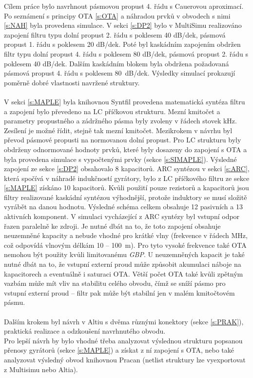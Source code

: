 \noindent Cílem práce bylo navrhnout pásmovou propust 4. řádu s Cauerovou aproximací. Po seznámení s principy OTA \ref{s:OTA} a náhradou prvků v obvodech s nimi \ref{s:NAH} byla provedena simulace. V sekci \ref{s:DP2} bylo v MultiSimu realizováno zapojení filtru typu dolní propust 2. řádu s poklesem 40 dB/dek, pásmová propust 1. řádu s poklesem 20 dB/dek. Poté byl kaskádním zapojením obdržen filtr typu dolní propust 4. řádu s poklesem 80 dB/dek, pásmová propust 2. řádu s poklesem 40 dB/dek. Dalším kaskádním blokem byla obdržena požadovaná pásmová propust 4. řádu s poklesem 80~dB/dek. Výsledky simulací prokazují poměrně dobré vlastnosti navržené struktury.\\
\\
V sekci \ref{s:MAPLE} byla knihovnou Syntfil provedena matematická syntéza filtru a zapojení bylo převedeno na LC příčkovou strukturu. Mezní kmitočet a parametry propustného a zádržného pásma byly zvoleny v řádech stovek kHz. Zesílení je možné řídit, stejně tak mezní kmitočet. Mezikrokem v návrhu byl převod pásmové propusti na normovanou dolní propust. Pro LC strukturu byly obdrženy odnormované hodnoty prvků, které byly dosazeny do zapojení s OTA a byla provedena simulace s vypočtenými prvky (sekce \ref{s:SIMAPLE}). Výsledné zapojení ze sekce \ref{s:DP2} obsahovalo 8 kapacitorů. ARC syntézou v sekci \ref{s:ARC}, která spočívá v náhradě indukčností gyrátory, bylo z LC příčkového filtru ze sekce \ref{s:MAPLE} získáno 10 kapacitorů. Kvůli použití pouze rezistorů a kapacitorů jsou filtry realizované kaskádní syntézou výhodnější, protože induktory se musí složitě vyrábět na danou hodnotu. Výsledné schéma celkem obsahuje 12 pasivních a 13 aktivních komponent. V simulaci vycházející z ARC syntézy byl vstupní odpor řazen paralelně ke zdroji. Je nutné dbát na to, že toto zapojení obsahuje neuzemněné kapacity a nebude vhodné pro krátké vlny (frekvence v řádech MHz, což odpovídá vlnovým délkám 10 -- 100~m). Pro tyto vysoké frekvence také OTA nemohou být použity kvůli limitovanému \textit{GBP}. U neuzemněných kapacit je také nutné dbát na to, že vstupní externí proud může způsobit akumulaci náboje na kapacitorech a eventuálně i saturaci OTA. Větší počet OTA také kvůli zpětným vazbám může mít vliv na stabilitu celého obvodu, čímž se sníží pásmo pro vstupní externí proud -- filtr pak může být stabilní jen v malém kmitočtovém pásmu.\\
\\
Dalším krokem byl návrh v Altiu s dvěma různými konektory (sekce \ref{s:PRAK}), praktická realizace a odzkoušení navrhnutého obvodu.\\
Pro lepší návrh by bylo vhodné třeba analyzovat výslednou strukturu popsanou přenosy gyrátorů (sekce \ref{s:MAPLE}) a získat z ní zapojení s OTA, nebo také analyzovat výsledný obvod knihovnou Pracan (netlist struktury lze vyexportovat z Multisimu nebo Altia).